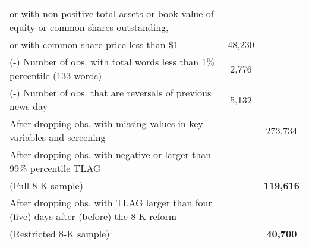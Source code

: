 \begin{table}[htbp]
\begin{tabular}{lcc}
    \hspace{5mm}or with non-positive total assets or book value of equity or common shares outstanding, & & \\
    \hspace{5mm}or with common share price less than \$1 & 48,230 & \\
    (-) Number of obs. with total words less than 1\% percentile (133 words) & 2,776 & \\
    (-) Number of obs. that are reversals of previous news day & 5,132 & \\
    \bottomrule
    After dropping obs. with missing values in key variables and screening  & & 273,734 \\
    After dropping obs. with negative or larger than 99\% percentile TLAG &  &  \\
    (Full 8-K sample)& & \textbf{119,616} \\
    After dropping obs. with TLAG larger than four (five) days after (before) the 8-K reform &  & \\
    (Restricted 8-K sample) &  & \textbf{40,700} 
    \end{tabular}%
\end{table}%

